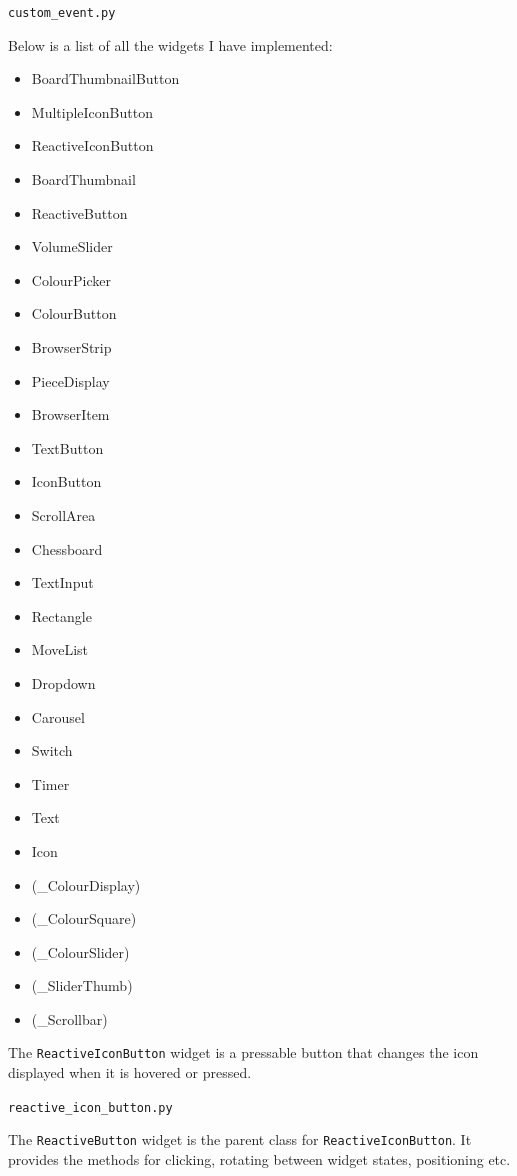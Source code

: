 \documentclass[../main/main.tex]{subfiles}
\begin{document}
\noindent\verb|custom_event.py|


Below is a list of all the widgets I have implemented:

\begin{multicols}{3}
\begin{itemize}
\item BoardThumbnailButton
\item MultipleIconButton
\item ReactiveIconButton
\item BoardThumbnail
\item ReactiveButton
\item VolumeSlider
\item ColourPicker
\item ColourButton
\item BrowserStrip
\item PieceDisplay
\item BrowserItem
\item TextButton
\item IconButton
\item ScrollArea
\item Chessboard
\item TextInput
\item Rectangle
\item MoveList
\item Dropdown
\item Carousel
\item Switch
\item Timer
\item Text
\item Icon
\item (\_ColourDisplay)
\item (\_ColourSquare)
\item (\_ColourSlider)
\item (\_SliderThumb)
\item (\_Scrollbar)
\end{itemize}
\end{multicols}

\bigskip
\noindent The \lstinline{ReactiveIconButton} widget is a pressable button that changes the icon displayed when it is hovered or pressed.

\noindent\verb|reactive_icon_button.py|


\bigskip
\noindent The \lstinline{ReactiveButton} widget is the parent class for \lstinline{ReactiveIconButton}. It provides the methods for clicking, rotating between widget states, positioning etc.
\end{document}
